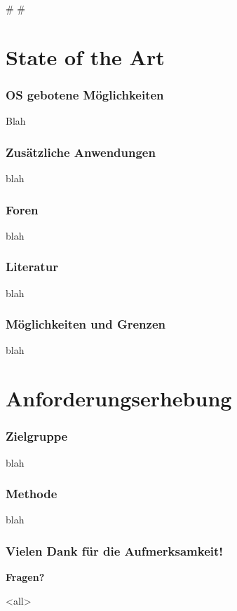 
\def\mytitle{Konzept der Requirements Analyse}
\def\myauthor{Anastasia Kazakova, Bengt Lüers}
\def\latexmode{beamer}
\def\latexxslt{beamer}
\def\theme{keynote-IntSysTheme}


\# \#

\section{State of the Art}
\label{stateoftheart}

\begin{frame}

\frametitle{OS gebotene Möglichkeiten}
\label{osgebotenemglichkeiten}

Blah

\end{frame}

\begin{frame}

\frametitle{Zusätzliche Anwendungen}
\label{zustzlicheanwendungen}

blah

\end{frame}

\begin{frame}

\frametitle{Foren}
\label{foren}

blah

\end{frame}

\begin{frame}

\frametitle{Literatur}
\label{literatur}

blah

\end{frame}

\begin{frame}

\frametitle{Möglichkeiten und Grenzen}
\label{mglichkeitenundgrenzen}

blah

\end{frame}

\section{Anforderungserhebung}
\label{anforderungserhebung}

\begin{frame}

\frametitle{Zielgruppe}
\label{zielgruppe}

blah

\end{frame}

\begin{frame}

\frametitle{Methode}
\label{methode}

blah

\end{frame}

\begin{frame}

\frametitle{Vielen Dank für die Aufmerksamkeit!}
\label{vielendankfrdieaufmerksamkeit}

\textbf{Fragen?}

\end{frame}

\mode<all>


\mode*

